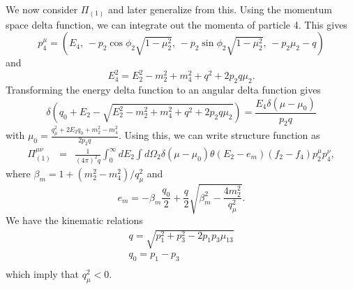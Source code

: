 \documentclass[12pt,letter]{article}
\begin{document}
We now consider $\Pi_{(1)}$ and later generalize from this.  Using the momentum space delta function, we can integrate out the momenta of particle 4.  This gives
\begin{equation*}
p^\mu_4 = (E_4, \, 
-p_2 \cos \phi_2 \sqrt{1-\mu_2^2}, \,
-p_2 \sin \phi_2 \sqrt{1-\mu_2^2}, \,
-p_2 \mu_2 - q)
\end{equation*}
and 
\begin{equation*}
E_4^2 = E_2^2 - m_2^2 + m_4^2 + q^2 + 2 p_2 q \mu_2.  
\end{equation*}
Transforming the energy delta function to an angular delta function gives 
\begin{equation*}
\delta\left(q_0 + E_2 - \sqrt{E_2^2 - m_2^2 + m_4^2 + q^2 + 2 p_2 q \mu_2} \right) 
= \frac{E_4 \delta(\mu - \mu_0)}{p_2 q} 
\end{equation*} 
with $\mu_0 = \frac{q_\mu^2 + 2 E_2 q_0 + m_2^2 - m_4^2}{2 p_2 q}$.  Using this, we can write structure function as 
\begin{eqnarray*}
\Pi^{\mu \nu}_{(1)} &=& \frac{1}{(4 \pi)^2 q} \int_{0}^\infty dE_2 
\int d \Omega_2 \delta(\mu - \mu_0) \theta(E_2-e_{m})
(f_2 - f_4) p_2^\mu p_4^\nu,
\end{eqnarray*} 
where $\beta_m = 1 + (m_2^2 - m_4^2)/q_\mu^2$ and
\begin{equation}
e_{m}=-\beta_m \frac{q_0}{2} + \frac{q}{2} \sqrt{\beta_m^2 - \frac{4 m_2^2}{q_\mu^2}}.
\end{equation}  
We have the kinematic relations
\begin{eqnarray*}
q = \sqrt{p_1^2 + p_3^2 - 2 p_1 p_3 \mu_{13}} \\
q_0 = p_1 - p_3 \\ 
\end{eqnarray*}
which imply that $q_\mu^2 < 0$.
\end{document}
